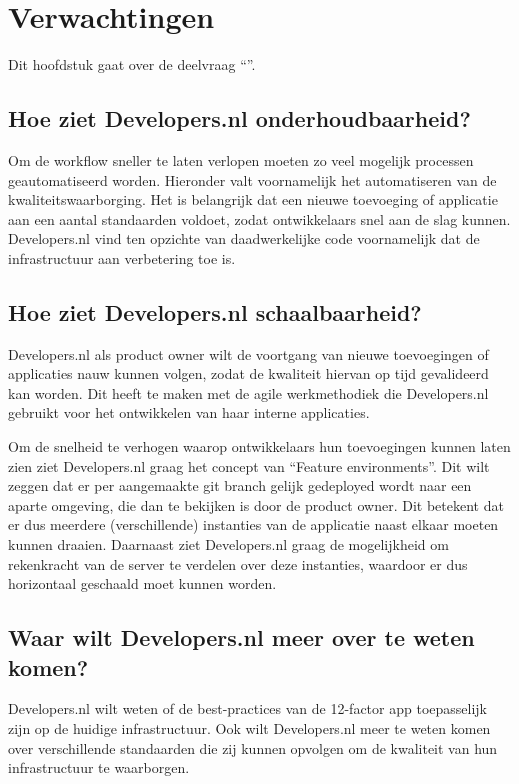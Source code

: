 \chapter{Verwachtingen}

\label{Verwachtingen}

Dit hoofdstuk gaat over de deelvraag \enquote{\deelverwachtingen}.

\section{Hoe ziet Developers.nl onderhoudbaarheid?}

Om de workflow sneller te laten verlopen moeten zo veel mogelijk processen geautomatiseerd worden. Hieronder valt voornamelijk het automatiseren van de kwaliteitswaarborging. Het is belangrijk dat een nieuwe toevoeging of applicatie aan een aantal standaarden voldoet, zodat ontwikkelaars snel aan de slag kunnen. Developers.nl vind ten opzichte van daadwerkelijke code voornamelijk dat de infrastructuur aan verbetering toe is.

\section{Hoe ziet Developers.nl schaalbaarheid?}

Developers.nl als product owner wilt de voortgang van nieuwe toevoegingen of applicaties nauw kunnen volgen, zodat de kwaliteit hiervan op tijd gevalideerd kan worden. Dit heeft te maken met de agile werkmethodiek die Developers.nl gebruikt voor het ontwikkelen van haar interne applicaties.

Om de snelheid te verhogen waarop ontwikkelaars hun toevoegingen kunnen laten zien ziet Developers.nl graag het concept van \enquote{Feature environments}. Dit wilt zeggen dat er per aangemaakte git branch gelijk gedeployed wordt naar een aparte omgeving, die dan te bekijken is door de product owner. Dit betekent dat er dus meerdere (verschillende) instanties van de applicatie naast elkaar moeten kunnen draaien. Daarnaast ziet Developers.nl graag de mogelijkheid om rekenkracht van de server te verdelen over deze instanties, waardoor er dus horizontaal geschaald moet kunnen worden.

\section{Waar wilt Developers.nl meer over te weten komen?}

Developers.nl wilt weten of de best-practices van de 12-factor app toepasselijk zijn op de huidige infrastructuur. Ook wilt Developers.nl meer te weten komen over verschillende standaarden die zij kunnen opvolgen om de kwaliteit van hun infrastructuur te waarborgen.

